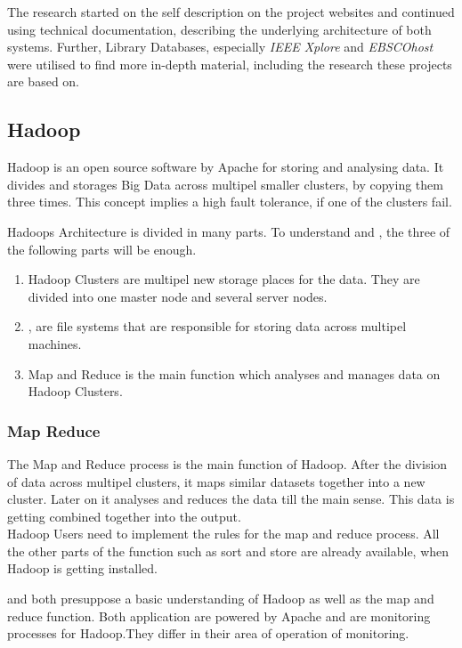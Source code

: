 The research started on the self description on the project websites and continued using technical documentation, describing the underlying architecture of both systems.
Further, Library Databases, especially \emph{IEEE Xplore} and \emph{EBSCOhost} were utilised to find more in-depth material, including the research these projects are based on.
	
\subsection{Hadoop}
\label{subsec:Hadoop}
Hadoop is an open source software by Apache for storing and analysing data. It divides and storages Big Data across multipel smaller clusters, by copying them three times. This concept implies a high fault tolerance, if one of the clusters fail.

Hadoops Architecture is divided in many parts. To understand \amb and \chuk, the three of the following parts will be enough.
  \\
  \begin{enumerate}
  	\item Hadoop Clusters are multipel new storage places for the data. They are divided into one master node and several server nodes.
  	\item \hdfs, are file systems that are responsible for storing data across multipel machines.
  	\item Map and Reduce is the main function which analyses and manages data on Hadoop Clusters.
  \end{enumerate}

\subsubsection*{Map Reduce}
The Map and Reduce process is the main function of Hadoop. After the division of data across multipel clusters, it maps similar datasets together into a new cluster. 
Later on it analyses and reduces the data till the main sense. This data is getting combined together into the output. 
\\
Hadoop Users need to implement the rules for the map and reduce process. All the other parts of the function such as sort and store are already available, when Hadoop is getting installed.


\amb and \chuk both presuppose a basic understanding of Hadoop as well as the map and reduce function. Both application are powered by Apache and are monitoring processes for Hadoop.They differ in their area of operation of monitoring. 